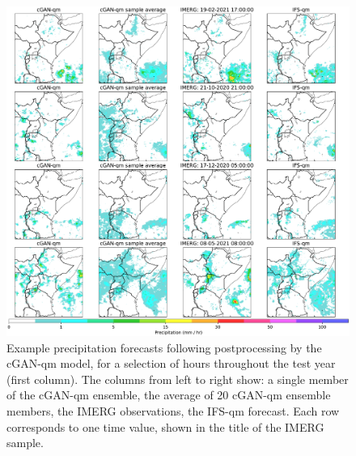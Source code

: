 \documentclass{article}
\begin{document}
\begin{figure}[ht!]
     \centering
     \includegraphics[width=1.05\textwidth]{images/cGAN_samples_IFS_final-nologs_217600.pdf}
     
     \caption{Example precipitation forecasts following postprocessing by the cGAN-qm model, for a selection of hours throughout the test year (first column). The columns from left to right show: a single member of the cGAN-qm ensemble, the average of 20 cGAN-qm ensemble members, the IMERG observations, the IFS-qm forecast. Each row corresponds to one time value, shown in the title of the IMERG sample.  }
     \label{fig:examples}
\end{figure}
\end{document}
